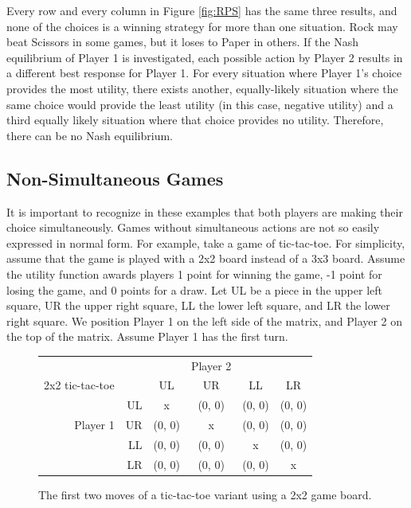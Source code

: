 Every row and every column in Figure \ref{fig:RPS} has the same three results, and none of the choices is a winning strategy for more than one situation. Rock may beat Scissors in some games, but it loses to Paper in others. If the Nash equilibrium of Player 1 is investigated, each possible action by Player 2 results in a different best response for Player 1. For every situation where Player 1's choice provides the most utility, there exists another, equally-likely situation where the same choice would provide the least utility (in this case, negative utility) and a third equally likely situation where that choice provides no utility. Therefore, there can be no Nash equilibrium.\\

\subsection{Non-Simultaneous Games}
It is important to recognize in these examples that both players are making their choice simultaneously. Games without simultaneous actions are not so easily expressed in normal form. For example, take a game of tic-tac-toe. For simplicity, assume that the game is played with a 2x2 board instead of a 3x3 board. Assume the utility function awards players 1 point for winning the game, -1 point for losing the game, and 0 points for a draw. Let UL be a piece in the upper left square, UR the upper right square, LL the lower left square, and LR the lower right square. We position Player 1 on the left side of the matrix, and Player 2 on the top of the matrix. Assume Player 1 has the first turn.\\
\begin{figure}[H]
  \centering
  \begin{tabular}{r r | c | c | c | c |}
    &\multicolumn{1}{c}{}&\multicolumn{1}{c}{}&\multicolumn{1}{c}{Player 2}&\multicolumn{1}{c}{}\\
    \multicolumn{1}{c}{2x2 tic-tac-toe}&\multicolumn{1}{c}{}&\multicolumn{1}{c}{UL}&
    \multicolumn{1}{c}{UR}&\multicolumn{1}{c}{LL}&\multicolumn{1}{c}{LR}\\ \cline{3-6}
    & UL & x & (0, 0) & (0, 0) & (0, 0) \\ \cline{3-6}
    Player 1 & UR & (0, 0) & x & (0, 0) & (0, 0) \\ \cline{3-6}
    & LL & (0, 0) & (0, 0) & x & (0, 0) \\ \cline{3-6}
    & LR & (0, 0) & (0, 0) & (0, 0) & x \\ \cline{3-6}
  \end{tabular}
  \caption{The first two moves of a tic-tac-toe variant using a 2x2 game board.}
  \label{fig:2x2TTT}
\end{figure}

